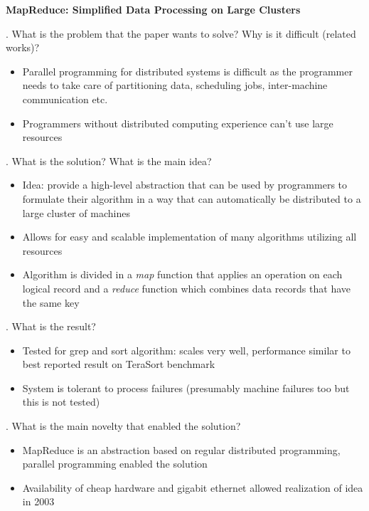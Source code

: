 \documentclass[12pt]{article}
\begin{document}
 

{\Large\centering
    \textbf{MapReduce: Simplified Data Processing on Large Clusters}
\par}

\bigskip

. What is the problem that the paper wants to solve? Why is it difficult (related works)?

\begin{itemize}
    \item Parallel programming for distributed systems is difficult as the programmer needs to take care of partitioning data, scheduling jobs, inter-machine communication etc.
    \item Programmers without distributed computing experience can't use large resources
\end{itemize}

. What is the solution? What is the main idea?

\begin{itemize}
    \item Idea: provide a high-level abstraction that can be used by programmers to formulate their algorithm in a way that can automatically be distributed to a large cluster of machines
    \item Allows for easy and scalable implementation of many algorithms utilizing all resources
    \item Algorithm is divided in a \emph{map} function that applies an operation on each logical record and a \emph{reduce} function which combines data records that have the same key
\end{itemize}

. What is the result?

\begin{itemize}
    \item Tested for grep and sort algorithm: scales very well, performance similar to best reported result on TeraSort benchmark
    \item System is tolerant to process failures (presumably machine failures too but this is not tested)
\end{itemize}

. What is the main novelty that enabled the solution?

\begin{itemize}
    \item MapReduce is an abstraction based on regular distributed programming, parallel programming enabled the solution
    \item Availability of cheap hardware and gigabit ethernet allowed realization of idea in 2003
\end{itemize}
\end{document}
